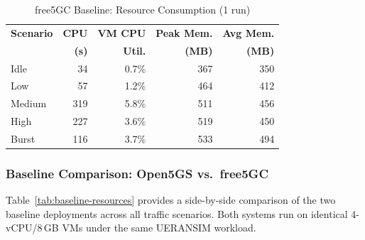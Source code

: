\documentclass[conference]{IEEEtran}
\begin{document}
\begin{table}[t]
  \centering
  \caption{free5GC Baseline: Resource Consumption (1 run)}
  \label{tab:free5gc-resources}
  \footnotesize
  \begin{tabular}{@{}lrr rr@{}}
  \toprule
  \textbf{Scenario} & \textbf{CPU} & \textbf{VM CPU} & \textbf{Peak Mem.} & \textbf{Avg Mem.} \\
   & \textbf{(s)} & \textbf{Util.} & \textbf{(MB)} & \textbf{(MB)} \\
  \midrule
  Idle      & 34   & 0.7\%  & 367  & 350 \\
  Low       & 57   & 1.2\%  & 464  & 412 \\
  Medium    & 319  & 5.8\%  & 511  & 456 \\
  High      & 227  & 3.6\%  & 519  & 450 \\
  Burst     & 116  & 3.7\%  & 533  & 494 \\
  \bottomrule
  \end{tabular}
  \end{table}


\subsubsection{Baseline Comparison: Open5GS vs.\ free5GC}

Table~\ref{tab:baseline-resources} provides a side-by-side comparison of the two baseline deployments across all traffic scenarios. Both systems run on identical 4-vCPU/8\,GB VMs under the same UERANSIM workload.
\end{document}
